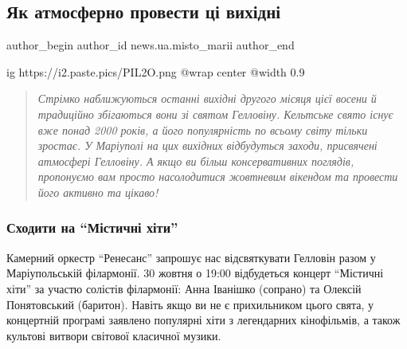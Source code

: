  
 
 
 
 
 
\subsection{Як атмосферно провести ці вихідні}
\label{sec:28_10_2021.stz.news.ua.misto_marii.1.atmosferno_provesty_ci_vyhidni}
 
\ifcmt
 author_begin
   author_id news.ua.misto_marii
 author_end
\fi

\ifcmt
  ig https://i2.paste.pics/PIL2O.png
  @wrap center
  @width 0.9
\fi

\begin{quote}
\em
Стрімко наближуються останні вихідні другого місяця цієї восени й традиційно
збігаються вони зі святом Гелловіну. Кельтське свято існує вже понад 2000
років, а його популярність по всьому світу тільки зростає. У Маріуполі на цих
вихідних відбудуться заходи, присвячені атмосфері Гелловіну. А якщо ви більш
консервативних поглядів, пропонуємо вам просто насолодитися жовтневим вікендом
та провести його активно та цікаво!
\end{quote}

\subsubsection{Сходити на \enquote{Містичні хіти}}


Камерний оркестр \enquote{Ренесанс} запрошує нас відсвяткувати Гелловін разом у
Маріупольській філармонії. 30 жовтня о 19:00 відбудеться концерт \enquote{Містичні
хіти} за участю солістів філармонії: Анна Іванішко (сопрано) та Олексій
Понятовський (баритон). Навіть якщо ви не є прихильником цього свята, у
концертній програмі заявлено популярні хіти з легендарних кінофільмів, а також
культові витвори світової класичної музики.

